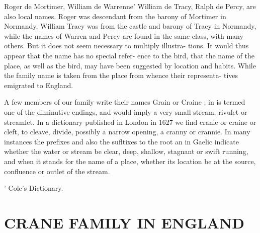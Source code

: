 \documentclass[oneside]{book}
\begin{document}
Roger de Mortimer, William de Warrenne' William de Tracy, 
Ralph de Percy, are also local names. Roger was descendant 
from the barony of Mortimer in Normandy, William Tracy was 
from the castle and barony of Tracy in Normandy, while the 
names of Warren and Percy are found in the same class, with 
many others. But it does not seem necessary to multiply illustra- 
tions. It would thus appear that the name has no special refer- 
ence to the bird, that the name of the place, as well as the bird, 
may have been suggested by location and habits. While the 
family name is taken from the place from whence their representa- 
tives emigrated to England. 

A few members of our family write their names Grain or 
Craine ; in is termed one of the diminutive endings, and would 
imply a very small stream, rivulet or streamlet. In a dictionary 
published in London in 1627 we find cranie or craine or cleft, 
to cleave, divide, possibly a narrow opening, a cranny or crannie. 
In many instances the prefixes and also the sufltixes to the root 
an in Gaelic indicate whether the water or stream be clear, deep, 
shallow, stagnant or swift running, and when it stands for the 
name of a place, whether its location be at the source, confluence 
or outlet of the stream. 



' Cole's Dictionary. 



\chapter{CRANE FAMILY IN ENGLAND}
\end{document}
